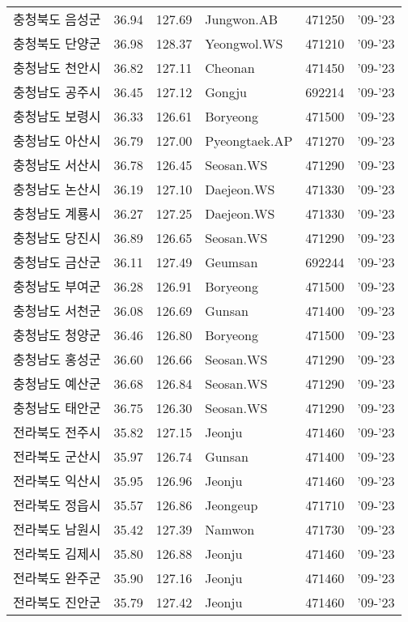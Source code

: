 \begin{longtable}{lcclcc}
  충청북도 음성군 & 36.94 & 127.69 & Jungwon.AB & 471250 & '09-'23 \\
  충청북도 단양군 & 36.98 & 128.37 & Yeongwol.WS & 471210 & '09-'23 \\
  충청남도 천안시 & 36.82 & 127.11 & Cheonan & 471450 & '09-'23 \\
  충청남도 공주시 & 36.45 & 127.12 & Gongju & 692214 & '09-'23 \\
  충청남도 보령시 & 36.33 & 126.61 & Boryeong & 471500 & '09-'23 \\
  충청남도 아산시 & 36.79 & 127.00 & Pyeongtaek.AP & 471270 & '09-'23 \\
  충청남도 서산시 & 36.78 & 126.45 & Seosan.WS & 471290 & '09-'23 \\
  충청남도 논산시 & 36.19 & 127.10 & Daejeon.WS & 471330 & '09-'23 \\
  충청남도 계룡시 & 36.27 & 127.25 & Daejeon.WS & 471330 & '09-'23 \\
  충청남도 당진시 & 36.89 & 126.65 & Seosan.WS & 471290 & '09-'23 \\
  충청남도 금산군 & 36.11 & 127.49 & Geumsan & 692244 & '09-'23 \\
  충청남도 부여군 & 36.28 & 126.91 & Boryeong & 471500 & '09-'23 \\
  충청남도 서천군 & 36.08 & 126.69 & Gunsan & 471400 & '09-'23 \\
  충청남도 청양군 & 36.46 & 126.80 & Boryeong & 471500 & '09-'23 \\
  충청남도 홍성군 & 36.60 & 126.66 & Seosan.WS & 471290 & '09-'23 \\
  충청남도 예산군 & 36.68 & 126.84 & Seosan.WS & 471290 & '09-'23 \\
  충청남도 태안군 & 36.75 & 126.30 & Seosan.WS & 471290 & '09-'23 \\
  전라북도 전주시 & 35.82 & 127.15 & Jeonju & 471460 & '09-'23 \\
  전라북도 군산시 & 35.97 & 126.74 & Gunsan & 471400 & '09-'23 \\
  전라북도 익산시 & 35.95 & 126.96 & Jeonju & 471460 & '09-'23 \\
  전라북도 정읍시 & 35.57 & 126.86 & Jeongeup & 471710 & '09-'23 \\
  전라북도 남원시 & 35.42 & 127.39 & Namwon & 471730 & '09-'23 \\
  전라북도 김제시 & 35.80 & 126.88 & Jeonju & 471460 & '09-'23 \\
  전라북도 완주군 & 35.90 & 127.16 & Jeonju & 471460 & '09-'23 \\
  전라북도 진안군 & 35.79 & 127.42 & Jeonju & 471460 & '09-'23 \\

\end{longtable}
